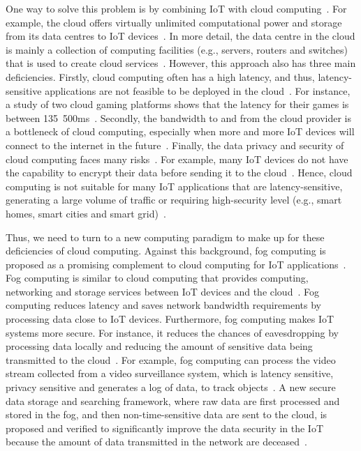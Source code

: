\documentclass[11pt]{phdthesis}
\begin{document}
One way to solve this problem is by combining IoT with cloud computing~\citep{chen2014vision}. For example,  the cloud offers virtually unlimited computational power and storage from its data centres to IoT devices~\citep{botta2016integration}. In more detail, the data centre in the cloud is mainly a collection of computing facilities (e.g., servers, routers and switches) that is used to create cloud services~\citep{greenberg2008cost}. However, this approach also has three main deficiencies. Firstly, cloud computing often has a high latency, and thus, latency-sensitive applications are not feasible to be deployed in the cloud~\citep{bonomi2012fog}. For instance, a study of two cloud gaming platforms shows that the latency for their games is between 135~500ms~\citep{chen2011measuring}. Secondly, the bandwidth to and from the cloud provider is a bottleneck of cloud computing, especially when more and more IoT devices will connect to the internet in the future~\citep{sarkar2018assessment}. Finally, the data privacy and security of cloud computing faces many risks~\citep{takabi2010security}. For example, many IoT devices do not have the capability to encrypt their data before sending it to the cloud~\citep{alrawais2017fog}. Hence, cloud computing is not suitable for many IoT applications that are latency-sensitive, generating a large volume of traffic or requiring high-security level (e.g., smart homes, smart cities and smart grid)~\citep{sen2015security}. 


Thus, we need to turn to a new computing paradigm to make up for these deficiencies of cloud computing. Against this background, fog computing is proposed as a promising complement to cloud computing for IoT applications~\citep{bonomi2012fog}. Fog computing is similar to cloud computing that provides computing, networking and storage services between IoT devices and the cloud~\citep{bonomi2012fog}. Fog computing reduces latency and saves network bandwidth requirements by processing data close to IoT devices. Furthermore, fog computing makes IoT systems more secure. For instance, it reduces the chances of eavesdropping by processing data locally and reducing the amount of sensitive data being transmitted to the cloud~\citep{bonomi2012fog}.
For example, fog computing can process the video stream collected from a video surveillance system, which is latency sensitive, privacy sensitive and generates a log of data, to track objects~\citep{liu2018object}. A new secure data storage and searching framework, where raw data are first processed and stored in the fog, and then non-time-sensitive data are sent to the cloud, is proposed and verified to significantly improve the data security in the IoT because the amount of data transmitted in the network are deceased~\citep{fu2018secure}.
\end{document}
